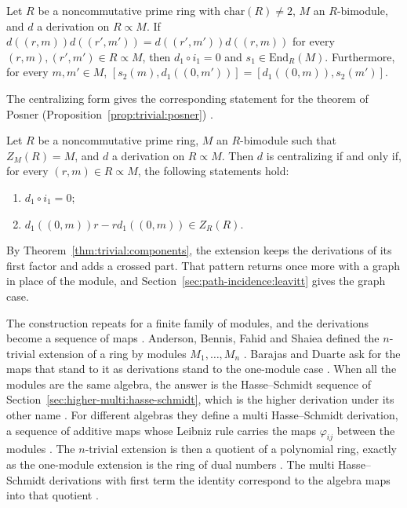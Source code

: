 \begin{theorem}\label{thm:trivial:herstein}
Let $R$ be a noncommutative prime ring with $\mathrm{char}(R)\neq 2$, $M$ an
$R$-bimodule, and $d$ a derivation on $R\propto M$. If
$d((r,m))d((r',m'))=d((r',m'))d((r,m))$ for every $(r,m),(r',m')\in R\propto M$,
then $d_{1}\circ i_{1}=0$ and $s_{1}\in\mathrm{End}_{R}(M)$. Furthermore, for every
$m,m'\in M$, $[s_{2}(m),d_{1}((0,m'))]=[d_{1}((0,m)),s_{2}(m')]$.
\end{theorem}

The centralizing form gives the corresponding statement for the theorem of Posner (Proposition~\ref{prop:trivial:posner})
\cite[p.~468]{BoudineZerra2024}.\begin{proposition}\label{prop:trivial:posner}
Let $R$ be a noncommutative prime ring, $M$ an $R$-bimodule such that
$Z_{M}(R)=M$, and $d$ a derivation on $R\propto M$. Then $d$ is centralizing if and
only if, for every $(r,m)\in R\propto M$, the following statements hold:
\begin{enumerate}[label=(\arabic*)]
\item $d_{1}\circ i_{1}=0$;
\item $d_{1}((0,m))r-rd_{1}((0,m))\in Z_{R}(R)$.
\end{enumerate}
\end{proposition}

By Theorem~\ref{thm:trivial:components}, the extension keeps the derivations
of its first factor and adds a crossed part. That pattern returns once more
with a graph in place of the module, and
Section~\ref{sec:path-incidence:leavitt} gives the graph case.

The construction repeats for a finite family of modules, and the derivations
become a sequence of maps \cite[p.~2]{BarajasDuarte2026}. Anderson, Bennis,
Fahid and Shaiea defined the $n$-trivial extension of a ring by modules
$M_1,\dots,M_n$ \cite[p.~2]{BarajasDuarte2026}. Barajas and Duarte ask for the
maps that stand to it as derivations stand to the one-module case
\cite[p.~2]{BarajasDuarte2026}. When all the modules are the same algebra, the
answer is the Hasse--Schmidt sequence of
Section~\ref{sec:higher-multi:hasse-schmidt}, which is the higher derivation
under its other name \cite[p.~2]{BarajasDuarte2026}. For different algebras
they define a multi Hasse--Schmidt derivation, a sequence of additive maps
whose Leibniz rule carries the maps $\varphi_{ij}$ between the modules
\cite[Definition~3.1, p.~6]{BarajasDuarte2026}. The $n$-trivial extension is
then a quotient of a polynomial ring, exactly as the one-module extension is
the ring of dual numbers \cite[Theorem~4.2, p.~13]{BarajasDuarte2026}. The
multi Hasse--Schmidt derivations with first term the identity correspond to
the algebra maps into that quotient \cite[Corollary~4.3,
p.~15]{BarajasDuarte2026}.

